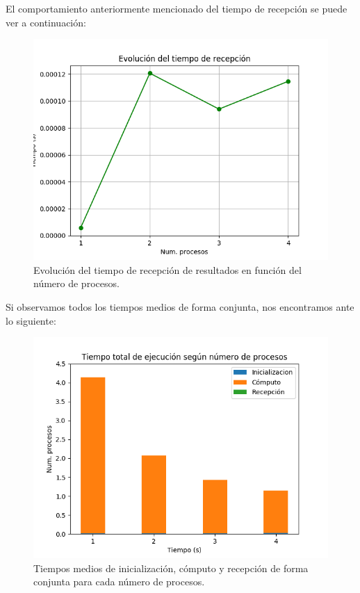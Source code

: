\documentclass[11pt,a4paper]{article}
\begin{document}
El comportamiento anteriormente mencionado del tiempo de recepción se puede ver a continuación:

\begin{figure}[H]
  \centering
  \includegraphics[scale=0.5]{img/evo-recep}
  \caption{Evolución del tiempo de recepción de resultados en función del número de procesos.}
  \label{fig:recep}
\end{figure}

Si observamos todos los tiempos medios de forma conjunta, nos encontramos ante lo siguiente:

\begin{figure}[H]
  \centering
  \includegraphics[scale=0.5]{img/evo-conjunta}
  \caption{Tiempos medios de inicialización, cómputo y recepción de forma conjunta para cada
   número de procesos.}
  \label{fig:recep}
\end{figure}
\end{document}
